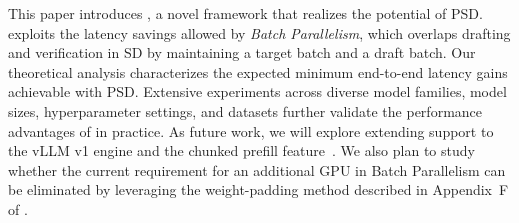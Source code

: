 

This paper introduces \alg{}, a novel framework that realizes the potential of PSD. \alg{} exploits the latency savings allowed by \textit{Batch Parallelism}, which overlaps drafting and verification in SD by maintaining a target batch and a draft batch. Our theoretical analysis characterizes the expected minimum end-to-end latency gains achievable with PSD. Extensive experiments across diverse model families, model sizes, hyperparameter settings, and datasets further validate the performance advantages of \alg{} in practice.
As future work, we will explore extending support to the vLLM v1 engine and the chunked prefill feature~\citep{agrawal2023sarathi}. We also plan to study whether the current requirement for an additional GPU in Batch Parallelism can be eliminated by leveraging the weight-padding method described in Appendix~F of \cite{liu2025pearl}.